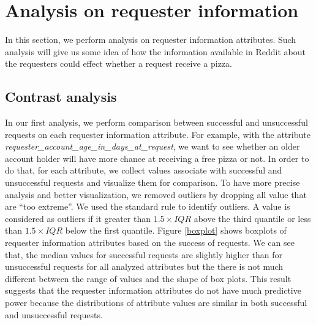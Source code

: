 \section{Analysis on requester information}
In this section, we perform analysis on requester information attributes. Such analysis will give us some idea of how the information available in Reddit about the requesters could effect whether a request receive a pizza.

\subsection{Contrast analysis}
In our first analysis, we perform comparison between successful and unsuccessful requests on each requester information attribute. For example, with the attribute \textit{requester\_account\_age\_in\_days\_at\_request}, we want to see whether an older account holder will have more chance at receiving a free pizza or not. In order to do that, for each attribute, we collect values associate with successful and unsuccessful requests and visualize them for comparison. To have more precise analysis and better visualization, we removed outliers by dropping all value that are ``too extreme''. We used the standard rule to identify outliers. A value is considered as outliers if it greater than $1.5 \times IQR$ above the third quantile or less than $1.5 \times IQR$ below the first quantile. Figure \ref{boxplot} shows boxplots of requester information attributes based on the success of requests. We can see that, the median values for successful requests are slightly higher than for unsuccessful requests for all analyzed attributes but the there is not much different between the range of values and the shape of box plots. This result suggests that the requester information attributes do not have much predictive power because the distributions of attribute values are similar in both successful and unsuccessful requests.
 
